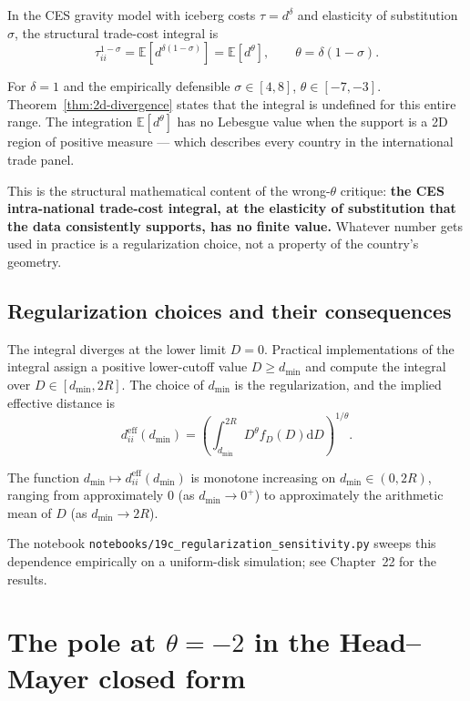 \documentclass[11pt,letterpaper,oneside]{book}
\theoremstyle{definition}
\theoremstyle{remark}
\newcommand{\E}{\mathbb{E}}
\newcommand{\diff}{\mathrm{d}}
\newcommand{\eff}{\mathrm{eff}}
\begin{document}
In the CES gravity model with iceberg costs $\tau = d^\delta$ and elasticity of substitution $\sigma$, the structural trade-cost integral is
\begin{equation}
\tau_{ii}^{1-\sigma} = \E[d^{\delta(1-\sigma)}] = \E[d^\theta], \qquad \theta = \delta(1-\sigma).
\end{equation}

For $\delta = 1$ and the empirically defensible $\sigma \in [4, 8]$, $\theta \in [-7, -3]$. Theorem~\ref{thm:2d-divergence} states that the integral is undefined for this entire range. The integration $\E[d^\theta]$ has no Lebesgue value when the support is a 2D region of positive measure --- which describes every country in the international trade panel.

This is the structural mathematical content of the wrong-$\theta$ critique: \textbf{the CES intra-national trade-cost integral, at the elasticity of substitution that the data consistently supports, has no finite value.} Whatever number gets used in practice is a regularization choice, not a property of the country's geometry.

\section{Regularization choices and their consequences}

The integral diverges at the lower limit $D = 0$. Practical implementations of the integral assign a positive lower-cutoff value $D \geq d_{\min}$ and compute the integral over $D \in [d_{\min}, 2R]$. The choice of $d_{\min}$ is the regularization, and the implied effective distance is
\begin{equation}
d_{ii}^{\eff}(d_{\min}) = \left( \int_{d_{\min}}^{2R} D^\theta f_D(D) \diff D \right)^{1/\theta}.
\end{equation}

The function $d_{\min} \mapsto d_{ii}^{\eff}(d_{\min})$ is monotone increasing on $d_{\min} \in (0, 2R)$, ranging from approximately 0 (as $d_{\min} \to 0^+$) to approximately the arithmetic mean of $D$ (as $d_{\min} \to 2R$).

The notebook \texttt{notebooks/19c\_regularization\_sensitivity.py} sweeps this dependence empirically on a uniform-disk simulation; see Chapter~22 for the results.

\chapter{The pole at $\theta = -2$ in the Head--Mayer closed form}
\end{document}
